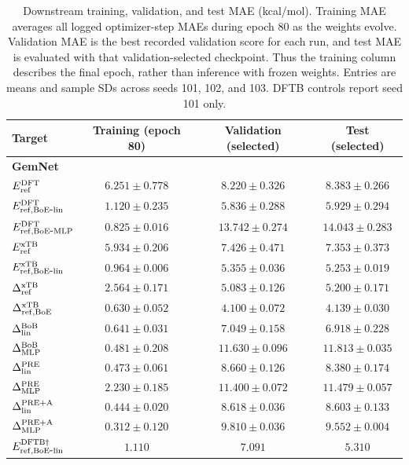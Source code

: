 \begin{table}[H]
\centering\scriptsize
\caption{Downstream training, validation, and test MAE (kcal/mol). Training MAE averages all logged optimizer-step MAEs during epoch 80 as the weights evolve. Validation MAE is the best recorded validation score for each run, and test MAE is evaluated with that validation-selected checkpoint. Thus the training column describes the final epoch, rather than inference with frozen weights. Entries are means and sample SDs across seeds 101, 102, and 103. DFTB controls report seed 101 only.}
\label{tab:si-gemnet-training-window}
\begin{tabular}{lccc}\toprule
Target & Training (epoch 80) & Validation (selected) & Test (selected) \\
\midrule
\multicolumn{4}{l}{\textbf{GemNet}} \\
\(E_{\rm ref}^{\rm DFT}\) & $6.251\pm0.778$ & $8.220\pm0.326$ & $8.383\pm0.266$ \\
\(E_{\rm ref,BoE\mbox{-}lin}^{\rm DFT}\) & $1.120\pm0.235$ & $5.836\pm0.288$ & $5.929\pm0.294$ \\
\(E_{\rm ref,BoE\mbox{-}MLP}^{\rm DFT}\) & $0.825\pm0.016$ & $13.742\pm0.274$ & $14.043\pm0.283$ \\
\(E_{\rm ref}^{\rm xTB}\) & $5.934\pm0.206$ & $7.426\pm0.471$ & $7.353\pm0.373$ \\
\(E_{\rm ref,BoE\mbox{-}lin}^{\rm xTB}\) & $0.964\pm0.006$ & $5.355\pm0.036$ & $5.253\pm0.019$ \\
\(\Delta^{\rm xTB}_{\rm ref}\) & $2.564\pm0.171$ & $5.083\pm0.126$ & $5.200\pm0.171$ \\
\(\Delta^{\rm xTB}_{\rm ref,BoE}\) & $0.630\pm0.052$ & $4.100\pm0.072$ & $4.139\pm0.030$ \\
\(\Delta^{\rm BoB}_{\rm lin}\) & $0.641\pm0.031$ & $7.049\pm0.158$ & $6.918\pm0.228$ \\
\(\Delta^{\rm BoB}_{\rm MLP}\) & $0.481\pm0.208$ & $11.630\pm0.096$ & $11.813\pm0.035$ \\
\(\Delta^{\rm PRE}_{\rm lin}\) & $0.473\pm0.061$ & $8.660\pm0.126$ & $8.380\pm0.174$ \\
\(\Delta^{\rm PRE}_{\rm MLP}\) & $2.230\pm0.185$ & $11.400\pm0.072$ & $11.479\pm0.057$ \\
\(\Delta^{\rm PRE+A}_{\rm lin}\) & $0.444\pm0.020$ & $8.618\pm0.036$ & $8.603\pm0.133$ \\
\(\Delta^{\rm PRE+A}_{\rm MLP}\) & $0.312\pm0.120$ & $9.810\pm0.036$ & $9.552\pm0.004$ \\
\(E_{\rm ref,BoE\mbox{-}lin}^{\rm DFTB\dagger}\) & $1.110$ & $7.091$ & $5.310$ \\

\end{tabular}
\end{table}
